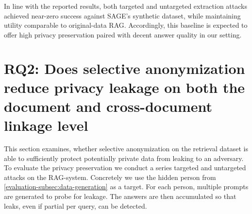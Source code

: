 In line with the reported results, both targeted and untargeted extraction attacks achieved near-zero success against SAGE's synthetic dataset, while maintaining utility comparable to original-data \ac{RAG}. Accordingly, this baseline is expected to offer high privacy preservation paired with decent answer quality in our setting.







\section{RQ2: Does selective anonymization reduce privacy leakage on both the document and cross-document linkage level}
This section examines, whether selective anonymization on the retrieval dataset is able to sufficiently protect potentially private data from leaking to an adversary. To evaluate the privacy preservation we conduct a series targeted and untargeted attacks on the \ac{RAG}-system. Concretely we use the hidden person from \ref{evaluation-subsec:data-generation} as a target. For each person, multiple prompts are generated to probe for leakage. The answers are then accumulated so that leaks, even if partial per query, can be detected.

